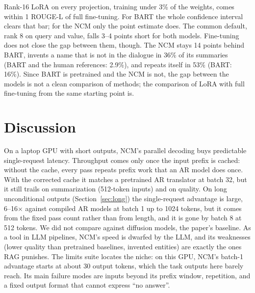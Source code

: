 \documentclass[11pt]{article}
\begin{document}
Rank-16 LoRA on every projection, training under 3\% of the weights, comes within 1 ROUGE-L of
full fine-tuning. For BART the whole confidence interval clears that bar; for the NCM only the
point estimate does. The common default, rank 8 on query and value, falls 3--4 points short for
both models. Fine-tuning does not close the gap between them, though. The NCM stays 14 points
behind BART, invents a name that is not in the dialogue in 36\% of its summaries (BART and the
human references: 2.9\%), and repeats itself in 53\% (BART: 16\%). Since BART is pretrained and
the NCM is not, the gap between the models is not a clean comparison of methods; the comparison
of LoRA with full fine-tuning from the same starting point is.

\section{Discussion}
On a laptop GPU with short outputs, NCM's parallel decoding buys predictable single-request
latency. Throughput comes only once the input prefix is cached: without the cache, every
pass repeats prefix work that an AR model does once. With the corrected cache it matches a
pretrained AR translator at batch 32, but it still trails on summarization (512-token
inputs) and on quality. On long unconditional outputs (Section~\ref{sec:long}) the
single-request advantage is large, 6--16$\times$ against compiled AR models at batch 1 up to
1024 tokens, but it comes from the fixed pass count rather than from length, and it is gone by
batch 8 at 512 tokens. We did not compare against diffusion models, the paper's baseline. As a tool in LLM pipelines, NCM's speed is dwarfed by the LLM, and
its weaknesses (lower quality than pretrained baselines, invented entities) are exactly the
ones RAG punishes.
The limits suite locates the niche: on this GPU, NCM's batch-1 advantage starts at about 30
output tokens, which the task outputs here barely reach. Its main failure modes are inputs
beyond its prefix window, repetition, and a fixed output format that cannot express ``no
answer''.
\end{document}
